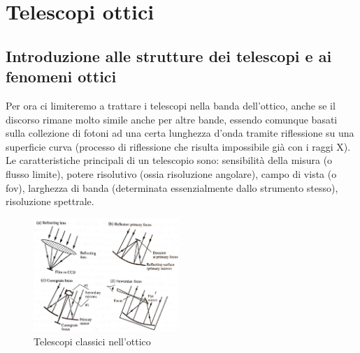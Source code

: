 \chapter{Telescopi ottici}

\section{Introduzione alle strutture dei telescopi e ai fenomeni ottici}

Per ora ci limiteremo a trattare i telescopi nella banda dell'ottico, anche se il discorso rimane molto simile anche per altre bande, essendo comunque basati sulla collezione di fotoni ad una certa lunghezza d'onda tramite riflessione su una superficie curva (processo di riflessione che risulta impossibile già con i raggi X). Le caratteristiche principali di un telescopio sono: sensibilità della misura (o flusso limite), potere risolutivo (ossia risoluzione angolare), campo di vista (o fov), larghezza di banda (determinata essenzialmente dallo strumento stesso), risoluzione spettrale.

\begin{figure}
	\vspace{-10pt}
	\centering
	\includegraphics[width=0.49\textwidth]{./Immagini/Capitolo2/Telescopi_classici.png}
	\caption{Telescopi classici nell'ottico}
	\vspace{-10pt}
\end{figure}

